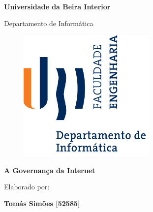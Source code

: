 \thispagestyle{empty}
\setcounter{page}{-1}

\begin{center}
  \begin{Huge}
    \textbf{Universidade da Beira Interior}
  \end{Huge}
\end{center}

\begin{center}
  \begin{Huge}
    Departamento de Informática
  \end{Huge}
\end{center}

\vspace{0,07cm}
\begin{figure}[!htb]
  \centering
  \includegraphics[width=191pt]{images/ubi-fe-di.png}
\end{figure}

\vspace{0.5cm}
\begin{center}
  \begin{Large}
    \textbf{A Governança da Internet}
  \end{Large}
\end{center}


\vspace{0.5cm}
\begin{center}
  \begin{normalsize}
    \begin{large}
      Elaborado por:
    \end{large}
  \end{normalsize}
\end{center}

\vspace{0.2cm}
\begin{center}
  \begin{large}
    \textbf{Tomás Simões [52585]}
  \end{large}
\end{center}


